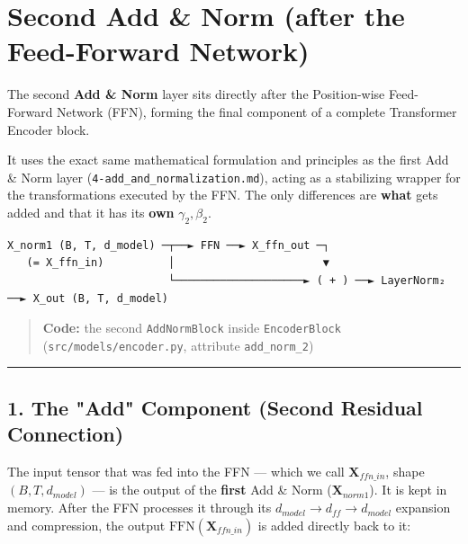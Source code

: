 \documentclass[11pt,a4paper,oneside]{report}
\begin{document}

\chapter{Second Add \& Norm (after the Feed-Forward Network)}\label{second-add--norm-after-the-feed-forward-network}

The second \textbf{Add \& Norm} layer sits directly after the Position-wise Feed-Forward Network (FFN), forming the final component of a complete Transformer Encoder block.

It uses the exact same mathematical formulation and principles as the first Add \& Norm layer (\texttt{4-add\_\allowbreak{}and\_\allowbreak{}normalization.\allowbreak{}md}), acting as a stabilizing wrapper for the transformations executed by the FFN. The only differences are \textbf{what} gets added and that it has its \textbf{own} \(\gamma_2, \beta_2\).

\begin{Verbatim}[fontsize=\footnotesize]
X_norm1 (B, T, d_model) ─┬──► FFN ──► X_ffn_out ─┐
   (= X_ffn_in)          │                       ▼
                         └────────────────────► ( + ) ──► LayerNorm₂ ──► X_out (B, T, d_model)
\end{Verbatim}

\begin{quote}
\textbf{Code:} the second \texttt{AddNormBlock} inside \texttt{EncoderBlock} (\texttt{src/\allowbreak{}models/\allowbreak{}encoder.\allowbreak{}py}, attribute \texttt{add\_\allowbreak{}norm\_\allowbreak{}2})
\end{quote}

\begin{center}\rule{0.5\linewidth}{0.5pt}\end{center}

\section{1. The "Add" Component (Second Residual Connection)}\label{1-the-add-component-second-residual-connection}

The input tensor that was fed into the FFN --- which we call \(\mathbf{X}_{ffn\_in}\), shape \((B, T, d_{model})\) --- is the output of the \textbf{first} Add \& Norm (\(\mathbf{X}_{norm1}\)). It is kept in memory. After the FFN processes it through its \(d_{model} \rightarrow d_{ff} \rightarrow d_{model}\) expansion and compression, the output \(\text{FFN}(\mathbf{X}_{ffn\_in})\) is added directly back to it:
\end{document}
